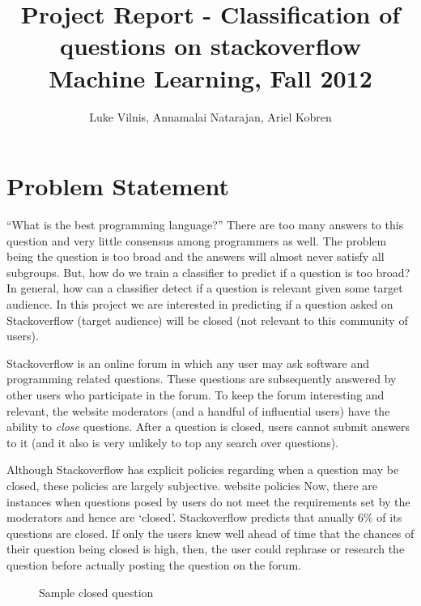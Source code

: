 \documentclass[11pt]{article}
\title{Project Report - Classification of questions on stackoverflow\\ Machine Learning, Fall 2012}
\author{Luke Vilnis, Annamalai Natarajan, Ariel Kobren}
\begin{document}
\sloppy

\maketitle

\section{Problem Statement}

``What is the best programming language?'' There are too many
answers to this question and very little consensus among programmers
as well. The problem being the question is too broad and the answers
will almost never satisfy all subgroups. But, how do we train a
classifier to predict if a question is too broad? In general, how can a
classifier detect if a question is relevant given some target
audience. In this project we are interested in predicting if a
question asked on Stackoverflow (target audience) will be closed (not
relevant to this community of users).

\noindent Stackoverflow \cite{website:stackoverflow} is an online
forum in which any user may ask software and programming related
questions. These questions are subsequently answered by other users
who participate in the forum. To keep the forum interesting and
relevant, the website moderators (and a handful of influential users)
have the ability to \emph{close} questions. After a question is
closed, users cannot submit answers to it (and it also is very
unlikely to top any search over questions).

Although Stackoverflow has explicit policies regarding when a question
may be closed, these policies are largely subjective. website policies Now, there are instances when questions posed by
users do not meet the requirements set by the moderators and hence are
`closed'. Stackoverflow predicts that anually 6\% of its questions are
closed. If only the users knew well ahead of time that the chances of
their question being closed is high, then, the user could rephrase or
research the question before actually posting the question on the
forum.

\begin{figure}
\centering
{}
\caption{Sample closed question}
\label{fig:sample}
\end{figure}
\end{document}

